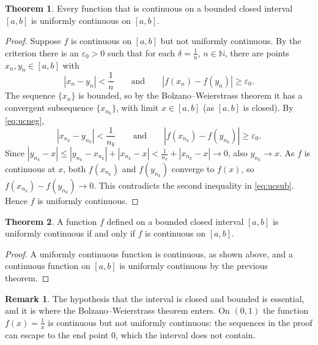 \documentclass[11pt,a4paper]{article}
\numberwithin{equation}{section}
\theoremstyle{definition}
\newtheorem{thm}{Theorem}[subsection]
\newtheorem*{remark}{Remark}
\begin{document}
\begin{thm}
Every function that is continuous on a bounded closed interval $[a,b]$ is uniformly continuous on $[a,b]$.
\end{thm}

\begin{proof}
Suppose $f$ is continuous on $[a,b]$ but not uniformly continuous. By the criterion there is an $\varepsilon_0 > 0$ such that for each $\delta = \frac{1}{n}$, $n\in\mathbb{N}$, there are points $x_n, y_n\in [a,b]$ with
\begin{equation}\label{eq:ucneg}
|x_n - y_n| < \frac{1}{n} \qquad\text{and}\qquad |f(x_n) - f(y_n)|\geq \varepsilon_0 .
\end{equation}
The sequence $\{x_n\}$ is bounded, so by the Bolzano--Weierstrass theorem it has a convergent subsequence $\{x_{n_k}\}$, with limit $x\in [a,b]$ (as $[a,b]$ is closed). By \eqref{eq:ucneg},
\begin{equation}\label{eq:ucsub}
|x_{n_k} - y_{n_k}| < \frac{1}{n_k} \qquad\text{and}\qquad |f(x_{n_k})- f(y_{n_k})|\geq \varepsilon_0 .
\end{equation}
Since $|y_{n_k} - x| \leq |y_{n_k} - x_{n_k}| + |x_{n_k} - x| < \frac{1}{n_k} + |x_{n_k} - x|\longrightarrow 0$, also $y_{n_k}\longrightarrow x$. As $f$ is continuous at $x$, both $f(x_{n_k})$ and $f(y_{n_k})$ converge to $f(x)$, so $f(x_{n_k}) - f(y_{n_k})\longrightarrow 0$. This contradicts the second inequality in \eqref{eq:ucsub}. Hence $f$ is uniformly continuous.
\end{proof}


\begin{thm}
A function $f$ defined on a bounded closed interval $[a,b]$ is uniformly continuous if and only if $f$ is continuous on $[a,b]$.
\end{thm}

\begin{proof}
A uniformly continuous function is continuous, as shown above, and a continuous function on $[a,b]$ is uniformly continuous by the previous theorem.
\end{proof}

\begin{remark}
The hypothesis that the interval is closed and bounded is essential, and it is where the Bolzano--Weierstrass theorem enters. On $(0,1)$ the function $f(x)=\frac{1}{x}$ is continuous but not uniformly continuous: the sequences in the proof can escape to the end point $0$, which the interval does not contain.
\end{remark}
\end{document}

